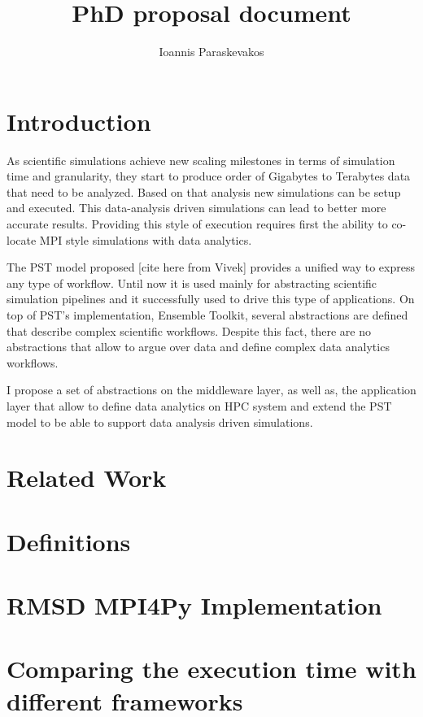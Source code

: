 



\title{PhD proposal document}
\author{Ioannis Paraskevakos}


\maketitle
\pagebreak

\section{Introduction}
As scientific simulations achieve new scaling milestones in terms of simulation time and granularity,
they start to produce order of Gigabytes to Terabytes data that need to be analyzed. Based on that
analysis new simulations can be setup and executed. This data-analysis driven simulations can lead to
better more accurate results. Providing this style of execution requires first the ability to co-locate
MPI style simulations with data analytics.

The PST model proposed [cite here from Vivek] provides a unified way to express any type of workflow. 
Until now it is used mainly for abstracting scientific simulation pipelines and it successfully used
to drive this type of applications. On top of PST's implementation, Ensemble Toolkit, several abstractions
are defined that describe complex scientific workflows. Despite this fact, there are no abstractions
that allow to argue over data and define complex data analytics workflows. 

I propose a set of abstractions on the middleware layer, as well as, the application layer that allow
to define data analytics on HPC system and extend the PST model to be able to support data analysis
driven simulations.


\section{Related Work}
\section{Definitions}

\section{RMSD MPI4Py Implementation}
\section{Comparing the execution time with different frameworks}



